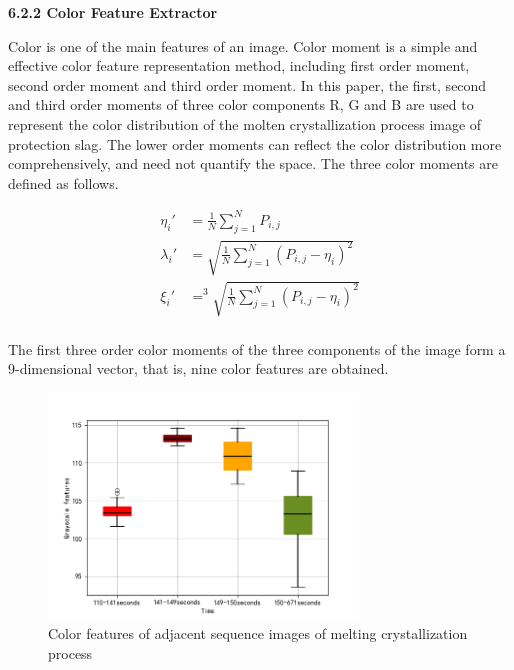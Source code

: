 \documentclass{apmcmthesis}
\begin{document}
	\noindent\textbf{6.2.2 Color Feature Extractor}
	
	Color is one of the main features of an image. Color moment is a simple and effective color feature representation method, including first order moment, second order moment and third order moment. In this paper, the first, second and third order moments of three color components R, G and B are used to represent the color distribution of the molten crystallization process image of protection slag. The lower order moments can reflect the color distribution more comprehensively, and need not quantify the space. The three color moments are defined as follows.
	
    \begin{equation}
	\tag{6-2-3}
	\begin{split}
		\eta_{i}'&=\frac{1}{N}\sum_{j=1}^{N}P_{i,j} \\
		\lambda_{i}'&=\sqrt{\frac{1}{N}\sum_{j=1}^{N}(P_{i,j}-\eta _{i})^{2}} \\
		\xi_{i}' &= ^3\sqrt{\frac{1}{N}\sum_{j=1}^{N}(P_{i,j}-\eta_{i})^{2}} \\
	\end{split}
\end{equation}
	
	The first three order color moments of the three components of the image form a 9-dimensional vector, that is, nine color features are obtained.

	
	\begin{figure}
		\centering
		\includegraphics[height=6cm]{./figures/gray.png}
		\caption{Color features of adjacent sequence images of melting crystallization process}
		\label{fig:9}
	\end{figure}
\end{document}
